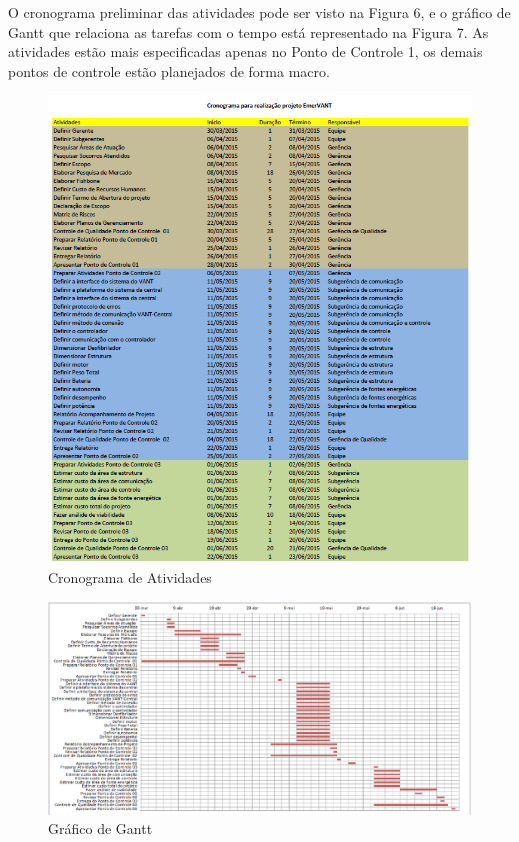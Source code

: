 O cronograma preliminar das atividades pode ser visto na Figura 6, e o gráfico de Gantt que relaciona as tarefas com o tempo está representado na Figura 7. As atividades estão mais especificadas apenas no Ponto de Controle 1, os demais pontos de controle estão planejados de forma macro.

 \begin{figure}[ht]
	\centering
		\includegraphics[keepaspectratio=true,scale=1]{figuras/cronograma.png}
	\caption{Cronograma de Atividades}
\end{figure}

 \begin{figure}[ht]
	\centering
		\includegraphics[keepaspectratio=true,scale=0.4,angle=90]{figuras/gantt.png}
	\caption{Gráfico de Gantt}
\end{figure}
